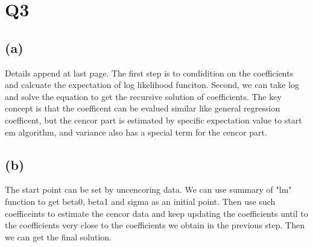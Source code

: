\documentclass{article}\usepackage[]{graphicx}\usepackage[]{color}
\begin{document}
\section{Q3}
\subsection{(a)}
Details append at last page. The first step is to condidition on the coefficients and calcuate the expectation of log likelihood funciton. Second, we can take log and solve the equation to get the recursive solution of coefficients. The key concept is that the coefficent can be evalued similar like general regression coefficent, but the cencor part is estimated by specific expectation value to start em algorithm, and variance also has a special term for the cencor part.
\subsection{(b)}
The start point can be set by uncencoring data. We can use summary of "lm" function to get beta0, beta1 and sigma as an initial point. Then use such coefficeints to estimate the cencor data and keep updating the coefficients until to the coefficients very close to the coefficients we obtain in the previous step. Then we can get the final solution.
\end{document}
